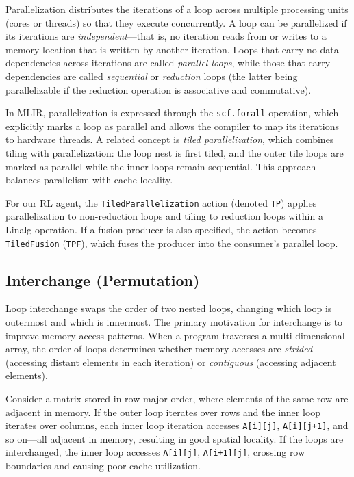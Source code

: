Parallelization distributes the iterations of a loop across multiple processing units (cores or threads) so that they execute concurrently. A loop can be parallelized if its iterations are \textit{independent}—that is, no iteration reads from or writes to a memory location that is written by another iteration. Loops that carry no data dependencies across iterations are called \textit{parallel loops}, while those that carry dependencies are called \textit{sequential} or \textit{reduction} loops (the latter being parallelizable if the reduction operation is associative and commutative).

In MLIR, parallelization is expressed through the \texttt{scf.forall} operation, which explicitly marks a loop as parallel and allows the compiler to map its iterations to hardware threads. A related concept is \textit{tiled parallelization}, which combines tiling with parallelization: the loop nest is first tiled, and the outer tile loops are marked as parallel while the inner loops remain sequential. This approach balances parallelism with cache locality.

For our RL agent, the \texttt{TiledParallelization} action (denoted \texttt{TP}) applies parallelization to non-reduction loops and tiling to reduction loops within a Linalg operation. If a fusion producer is also specified, the action becomes \texttt{TiledFusion} (\texttt{TPF}), which fuses the producer into the consumer's parallel loop.

\subsection{Interchange (Permutation)}

Loop interchange swaps the order of two nested loops, changing which loop is outermost and which is innermost. The primary motivation for interchange is to improve memory access patterns. When a program traverses a multi-dimensional array, the order of loops determines whether memory accesses are \textit{strided} (accessing distant elements in each iteration) or \textit{contiguous} (accessing adjacent elements).

Consider a matrix stored in row-major order, where elements of the same row are adjacent in memory. If the outer loop iterates over rows and the inner loop iterates over columns, each inner loop iteration accesses \texttt{A[i][j]}, \texttt{A[i][j+1]}, and so on—all adjacent in memory, resulting in good spatial locality. If the loops are interchanged, the inner loop accesses \texttt{A[i][j]}, \texttt{A[i+1][j]}, crossing row boundaries and causing poor cache utilization.


